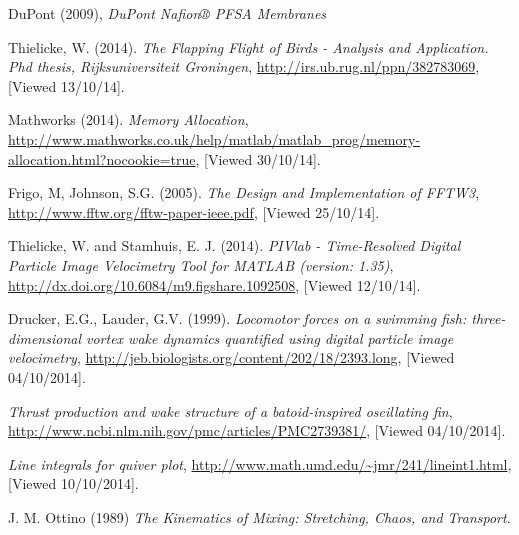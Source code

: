


\begin{thebibliography}{1}

 DuPont (2009), {\em DuPont Nafion® PFSA Membranes}

 Thielicke, W. (2014). {\em The Flapping Flight of Birds - Analysis and Application. Phd thesis, Rijksuniversiteit Groningen}, \url{http://irs.ub.rug.nl/ppn/382783069}, [Viewed 13/10/14].

 Mathworks (2014). {\em Memory Allocation}, \url{http://www.mathworks.co.uk/help/matlab/matlab_prog/memory-allocation.html?nocookie=true}, [Viewed 30/10/14].

 Frigo, M, Johnson, S.G. (2005). {\em The Design and Implementation of FFTW3}, \url{http://www.fftw.org/fftw-paper-ieee.pdf}, [Viewed 25/10/14].

Thielicke, W. and Stamhuis, E. J. (2014). {\em PIVlab - Time-Resolved Digital Particle Image Velocimetry Tool for MATLAB (version: 1.35)}, \url{http://dx.doi.org/10.6084/m9.figshare.1092508}, [Viewed 12/10/14].

Drucker, E.G., Lauder, G.V. (1999). {\em Locomotor forces on a swimming fish: three-dimensional vortex wake dynamics quantified using digital particle image velocimetry}, \url{http://jeb.biologists.org/content/202/18/2393.long}, [Viewed 04/10/2014].

 {\em Thrust production and wake structure of a batoid-inspired oscillating fin}, \url{http://www.ncbi.nlm.nih.gov/pmc/articles/PMC2739381/}, [Viewed 04/10/2014].

 {\em Line integrals for quiver plot}, \url{http://www.math.umd.edu/~jmr/241/lineint1.html}, [Viewed 10/10/2014].

 J. M. Ottino (1989) {\em The Kinematics of Mixing: Stretching, Chaos, and Transport}.

\end{thebibliography}
